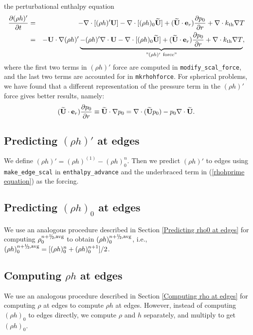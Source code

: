 the perturbational enthalpy equation
\begin{eqnarray}
\frac{\partial(\rho h)'}{\partial t} &=& -\nabla\cdot[(\rho h)'{\bf U}] 
- \nabla\cdot[(\rho h)_0\widetilde{{\bf U}}] + (\widetilde{{\bf U}} \cdot \mathbf{e}_r)\frac{\partial p_0}{\partial r} 
+ \nabla\cdot k_{\rm th}\nabla T\nonumber \\
&=& -{\bf U}\cdot\nabla(\rho h)' \underbrace{- (\rho h)'\nabla\cdot{\bf U} 
- \nabla\cdot[(\rho h)_0\widetilde{{\bf U}}] + (\widetilde{{\bf U}} \cdot \mathbf{e}_r)\frac{\partial p_0}{\partial r}
+ \nabla\cdot k_{\rm th}\nabla T}_{"(\rho h)' ~ \text{force}"}, \label{rhohprime equation}
\end{eqnarray}
where the first two terms in $(\rho h)'$ force are computed in 
{\tt modify\_scal\_force}, and the last two terms are accounted for in
{\tt mkrhohforce}.  For spherical problems, we have found that a different 
representation of the pressure term in the $(\rho h)'$ force gives better
results, namely:
\begin{equation}
(\widetilde{{\bf U}} \cdot \mathbf{e}_r)\frac{\partial p_0}{\partial r} \equiv \widetilde{{\bf U}}\cdot\nabla p_0 = 
\nabla\cdot(\widetilde{{\bf U}} p_0) - p_0\nabla\cdot\widetilde{{\bf U}}.
\end{equation}

\subsection{Predicting $(\rho h)'$ at edges}\label{Predicting rhohprime at edges}
We define $(\rho h)' = (\rho h)^{(1)} - (\rho h)_0^n$.  Then we predict 
$(\rho h)'$ to edges using {\tt make\_edge\_scal} in {\tt enthalpy\_advance} 
and the underbraced term in (\ref{rhohprime equation}) as the forcing.

\subsection{Predicting $(\rho h)_0$ at edges}
We use an analogous procedure described in Section \ref{Predicting
rho0 at edges} for computing $\rho_0^{n+\myhalf,\rm{avg}}$ to obtain 
$(\rho h)_0^{n+\myhalf,\rm{avg}}$, i.e., 
$(\rho h)_0^{n+\myhalf,{\rm avg}} = [(\rho h)_0^{n} + (\rho h)_0^{n+1}]/2$.

\subsection{Computing $\rho h$ at edges}
We use an analogous procedure described in Section \ref{Computing rho
at edges} for computing $\rho$ at edges to compute $\rho h$ at edges.
However, instead of computing $(\rho h)_0$ to edges directly, we compute $\rho$
and $h$ separately, and multiply to get $(\rho h)_0$.

